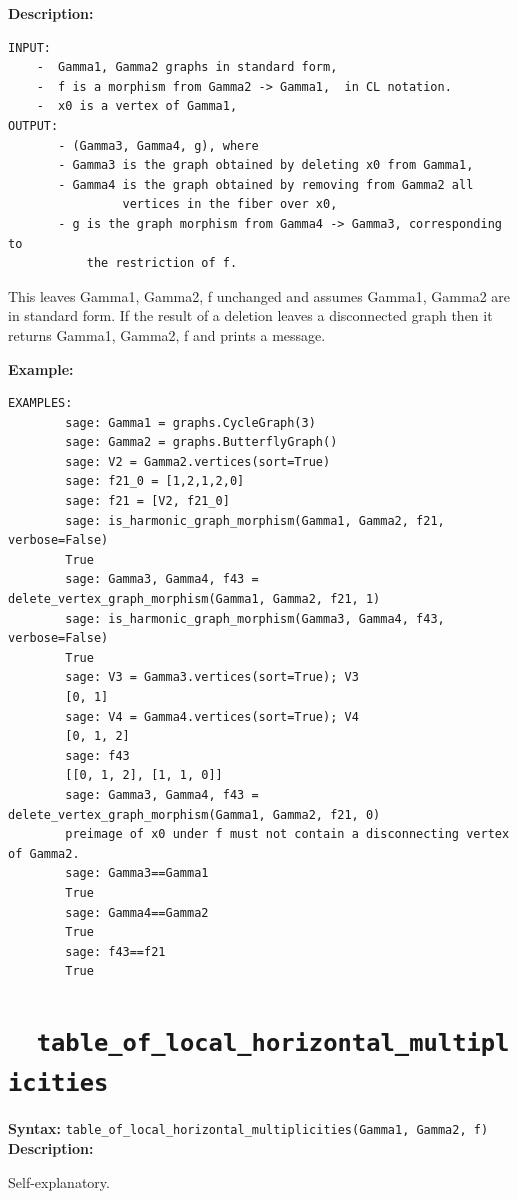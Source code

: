 \documentclass{article}
\begin{document}
\textbf{Description:}
\begin{verbatim}
INPUT:
    -  Gamma1, Gamma2 graphs in standard form,
    -  f is a morphism from Gamma2 -> Gamma1,  in CL notation.
    -  x0 is a vertex of Gamma1, 
OUTPUT:
       - (Gamma3, Gamma4, g), where
       - Gamma3 is the graph obtained by deleting x0 from Gamma1,
       - Gamma4 is the graph obtained by removing from Gamma2 all
                vertices in the fiber over x0, 
       - g is the graph morphism from Gamma4 -> Gamma3, corresponding to  
           the restriction of f.
\end{verbatim}
    
    This leaves Gamma1, Gamma2, f unchanged and assumes Gamma1, Gamma2 are in standard form.
    If the result of a deletion leaves a disconnected graph then it returns 
    Gamma1, Gamma2, f and prints a message.

\textbf{Example:}
\begin{verbatim}
EXAMPLES:
        sage: Gamma1 = graphs.CycleGraph(3)
        sage: Gamma2 = graphs.ButterflyGraph()
        sage: V2 = Gamma2.vertices(sort=True)
        sage: f21_0 = [1,2,1,2,0]
        sage: f21 = [V2, f21_0]
        sage: is_harmonic_graph_morphism(Gamma1, Gamma2, f21, verbose=False)
        True
        sage: Gamma3, Gamma4, f43 = delete_vertex_graph_morphism(Gamma1, Gamma2, f21, 1)
        sage: is_harmonic_graph_morphism(Gamma3, Gamma4, f43, verbose=False)
        True
        sage: V3 = Gamma3.vertices(sort=True); V3
        [0, 1]
        sage: V4 = Gamma4.vertices(sort=True); V4
        [0, 1, 2]
        sage: f43
        [[0, 1, 2], [1, 1, 0]]
        sage: Gamma3, Gamma4, f43 = delete_vertex_graph_morphism(Gamma1, Gamma2, f21, 0)
        preimage of x0 under f must not contain a disconnecting vertex of Gamma2.
        sage: Gamma3==Gamma1
        True
        sage: Gamma4==Gamma2
        True
        sage: f43==f21
        True
\end{verbatim}

\section{\tt \ \ table\_of\_local\_horizontal\_multiplicities}

\textbf{Syntax:} \verb}table_of_local_horizontal_multiplicities(Gamma1, Gamma2, f)}\\

\textbf{Description:}

Self-explanatory.
\end{document}
